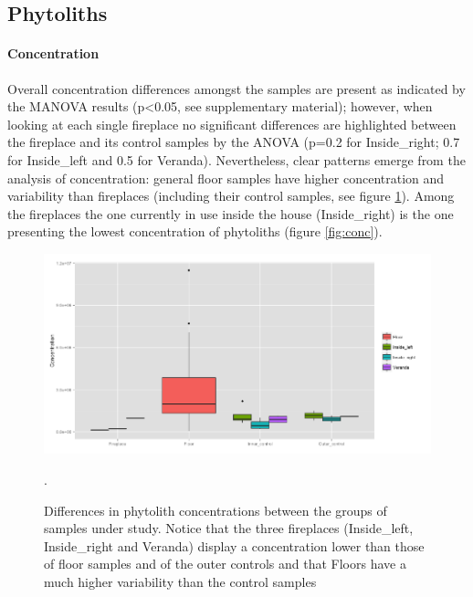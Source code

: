 \documentclass[authoryear,preprint,review,12pt]{elsarticle}
\begin{document}
\subsection{Phytoliths}
\label{subsec:3.1}
\paragraph{Concentration}
Overall concentration differences amongst the samples are present as indicated by the MANOVA results (p\textless{0.05}, see supplementary material); however, when looking at each single fireplace no significant differences are highlighted between the fireplace and its control samples by the ANOVA (p=0.2 for Inside\_right; 0.7 for Inside\_left and 0.5 for Veranda). Nevertheless, clear patterns emerge from the analysis of concentration: general floor samples have higher concentration and variability than fireplaces (including their control samples, see figure \ref{fig:box}). Among the fireplaces the one currently in use inside the house (Inside\_right) is the one presenting the lowest concentration of phytoliths (figure \ref{fig:conc}). 

\begin{figure}[ht!]
  \begin{center}
    \includegraphics[width=15cm]{figures/concentration_fp}
    \caption{Differences in phytolith concentrations between the groups of samples under study. Notice that the three fireplaces (Inside\_left, Inside\_right and Veranda) display a concentration lower than those of floor samples and of the outer controls and that Floors have a much higher variability than the control samples}.
    \label{fig:box}
  \end{center}
\end{figure}
\end{document}
